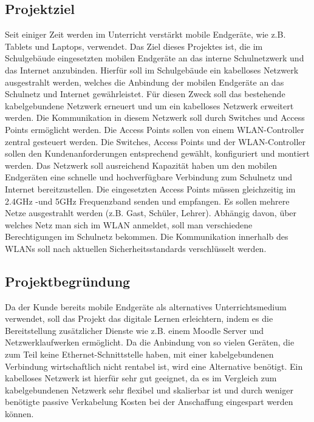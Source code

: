 \subsection{Projektziel} 
\label{sec:Projektziel}
Seit einiger Zeit werden im Unterricht verstärkt mobile Endgeräte, wie z.B. Tablets und Laptops, verwendet. 
Das Ziel dieses Projektes ist, die im Schulgebäude eingesetzten mobilen Endgeräte an das interne Schulnetzwerk und das Internet anzubinden. 
Hierfür soll im Schulgebäude ein kabelloses Netzwerk ausgestrahlt werden, welches die Anbindung der mobilen Endgeräte an das Schulnetz und Internet gewährleistet. 
Für diesen Zweck soll das bestehende kabelgebundene Netzwerk erneuert und um ein kabelloses Netzwerk erweitert werden. 
Die Kommunikation in diesem Netzwerk soll durch Switches und Access Points ermöglicht werden. 
Die Access Points sollen von einem WLAN-Controller zentral gesteuert werden. 
Die Switches, Access Points und der WLAN-Controller sollen den Kundenanforderungen entsprechend gewählt, konfiguriert und montiert werden. 
Das Netzwerk soll ausreichend Kapazität haben um den mobilen Endgeräten eine schnelle und hochverfügbare Verbindung zum Schulnetz und Internet bereitzustellen. 
Die eingesetzten Access Points müssen gleichzeitig im 2.4GHz -und 5GHz Frequenzband senden und empfangen. 
Es sollen mehrere Netze ausgestrahlt werden (z.B. Gast, Schüler, Lehrer). 
Abhängig davon, über welches Netz man sich im WLAN anmeldet, soll man verschiedene Berechtigungen im Schulnetz bekommen. 
Die Kommunikation innerhalb des WLANs soll nach aktuellen Sicherheitsstandards verschlüsselt werden.


\subsection{Projektbegründung} 
\label{sec:Projektbegruendung}
Da der Kunde bereits mobile Endgeräte als alternatives Unterrichtsmedium verwendet, soll das Projekt das digitale Lernen erleichtern, indem es die Bereitstellung zusätzlicher Dienste wie z.B. einem Moodle Server und Netzwerklaufwerken ermöglicht. 
Da die Anbindung von so vielen Geräten, die zum Teil keine Ethernet-Schnittstelle haben, mit einer kabelgebundenen Verbindung wirtschaftlich nicht rentabel ist, wird eine Alternative benötigt. 
Ein kabelloses Netzwerk ist hierfür sehr gut geeignet, da es im Vergleich zum kabelgebundenen Netzwerk sehr flexibel und skalierbar ist und durch weniger benötigte passive Verkabelung Kosten bei der Anschaffung eingespart werden können. 


